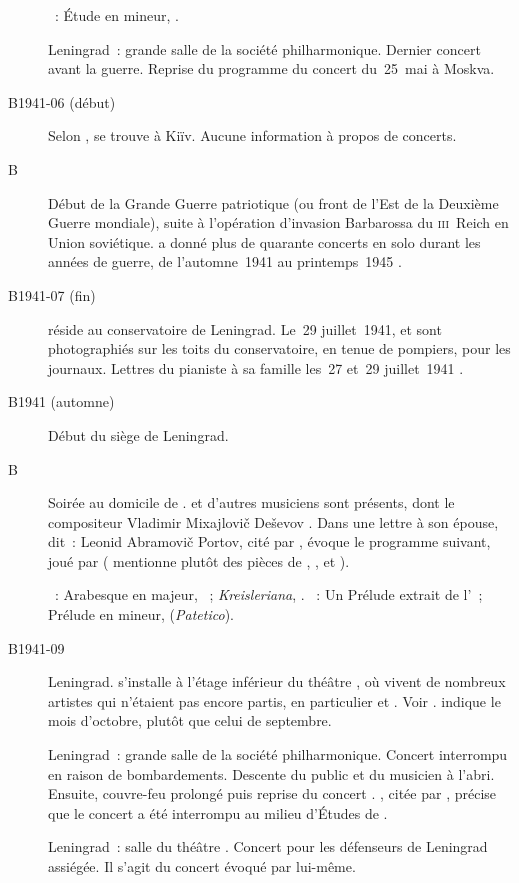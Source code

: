 \begin{description}
 \textsc{\Scriabine{}}~: Étude en \kD \Sharp mineur,  .
 \item[\DateWithWeekDay{1941-05-28}]
 Leningrad~: grande salle de la société philharmonique.
 Dernier concert avant la guerre.
 Reprise du programme du concert du~25~mai à Moskva.
 \item[B1941-06 (début)]
 Selon \ASofronitsky{}, \VSofronitsky{} se trouve à Kiïv.
 Aucune information à propos de concerts.
 \item[B\DateWithWeekDay{1941-06-22}]
 Début de la Grande Guerre patriotique (ou front de l'\hbox{Est} de la
 Deuxième Guerre mondiale), suite à l'opération d'invasion Barbarossa du
 \textsc{iii}\ieme{}~Reich en Union soviétique.
 \VSofronitsky{} a donné plus de quarante concerts en solo durant les années
 de guerre, de l'automne~1941 au printemps~1945 \citep[p.~167]{Nekrasova08}.
 \item[B1941-07 (fin)]
 \VSofronitsky{} réside au conservatoire de Leningrad.
 Le~29 juillet~1941, \DChostakovitch{} et \VSofronitsky{} sont photographiés
 sur les toits du conservatoire, en tenue de pompiers, pour les journaux.
 Lettres du pianiste à sa famille les~27 et~29 juillet~1941
 \citep[p.~31]{Kogan08}.
 \item[B1941 (automne)]
 Début du siège de Leningrad.
 \item[B\DateWithWeekDay{1941-09-01}]
 Soirée au domicile de \VBogdanovBerezovsky{}.
 \IMiklashevsky{} et d'autres musiciens sont présents, dont le compositeur
 Vladimir Mixajlovič Deševov \citep[voir][]{Bogdanov67a}.
 Dans une lettre à son épouse, \VSofronitsky{} dit~: 
 Leonid Abramovič Portov, cité par \citet[p.~202-203]{Sofronitsky13b},
 évoque le programme suivant, joué par \Sofronitsky{} (\BogdanovBerezovsky{}
 mentionne plutôt des pièces de \Prokofiev{}, \Scriabine{}, \Schumann{} et
 \Debussy{}).

 \textsc{\Schumann{}}~: Arabesque en \kC majeur, ~;
 \emph{Kreisleriana}, .
 \textsc{\Scriabine{}}~: Un Prélude extrait de l'~; Prélude en \kG
 mineur,   (\emph{Patetico}).
 \item[B1941-09]
 Leningrad.
 \VSofronitsky{} s'installe à l'étage inférieur du théâtre \Pouchkine{}, où
 vivent de nombreux artistes qui n'étaient pas encore partis, en particulier
 \DShafran{} et \DChostakovitch{}.
 Voir \citet[p.~58]{Juban}.
 \citet[p.~165]{Nekrasova08} indique le mois d'octobre, plutôt que celui de
 septembre.
 \item[\DateWithWeekDay{1941-11-07}]
 Leningrad~: grande salle de la société philharmonique.
 Concert interrompu en raison de bombardements.
 Descente du public et du musicien à l'abri.
 Ensuite, couvre-feu prolongé puis reprise du concert
 \citep[voir][p.~164]{Nekrasova08}.
 \citet[p.~342]{Savkevich}, citée par \citet[p.~203]{Sofronitsky13b},
 précise que le concert a été interrompu au milieu d'\hbox{Études} de
 \Chopin{}.
 \item[\DateWithWeekDay{1941-12-12}]
 Leningrad~: salle du théâtre \Pouchkine{}.
 Concert pour les défenseurs de Leningrad assiégée.
 Il s'agit du concert évoqué par \citet{Sofronitsky42, Sofronitsky61}
 lui-même.
\end{description}

